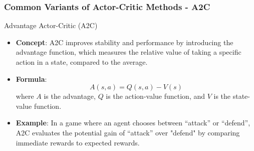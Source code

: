 \documentclass{beamer}
\begin{document}
\begin{frame}[fragile]
    \frametitle{Common Variants of Actor-Critic Methods - A2C}
    \begin{block}{Advantage Actor-Critic (A2C)}
        \begin{itemize}
            \item \textbf{Concept}: A2C improves stability and performance by introducing the advantage function, which measures the relative value of taking a specific action in a state, compared to the average.
            \item \textbf{Formula}:
            \begin{equation}
                A(s, a) = Q(s, a) - V(s)
            \end{equation}
            where \(A\) is the advantage, \(Q\) is the action-value function, and \(V\) is the state-value function.
            \item \textbf{Example}: In a game where an agent chooses between “attack” or “defend”, A2C evaluates the potential gain of “attack” over "defend" by comparing immediate rewards to expected rewards.
        \end{itemize}
    \end{block}
\end{frame}
\end{document}
